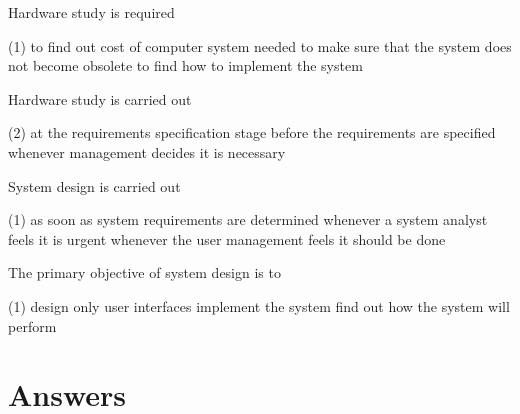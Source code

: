 \documentclass{article}
\begin{document}
\begin{questions}
    \begin{exercise}
        Hardware study is required
        \begin{choice}(1)
            \choice to find out cost of computer system needed
            \choice {}
            \choice to make sure that the system does not become obsolete
            \choice to find how to implement the system
        \end{choice}
    \end{exercise}
    \begin{exercise}
        Hardware study is carried out
        \begin{choice}(2)
            \choice {}
            \choice at the requirements specification stage
            \choice before the requirements are specified
            \choice whenever management decides it is necessary
        \end{choice}
    \end{exercise}
    \begin{exercise}
        System design is carried out
        \begin{choice}(1)
            \choice as soon as system requirements are determined
            \choice whenever a system analyst feels it is urgent
            \choice {}
            \choice whenever the user management feels it should be done
        \end{choice}
    \end{exercise}
    \begin{exercise}
        The primary objective of system design is to
        \begin{choice}(1)
            \choice {}
            \choice design only user interfaces
            \choice implement the system
            \choice find out how the system will perform
        \end{choice}

    \end{exercise}
\end{questions}
\section*{Answers}
\begin{multicols}{2}
    \getanswers
\end{multicols}
\end{document}
